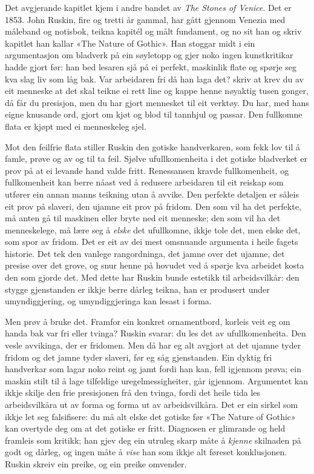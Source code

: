 Det avgjerande kapitlet kjem i andre bandet av \textit{The Stones of Venice}. Det er 1853. John Ruskin, fire og tretti år gammal, har gått gjennom Venezia med måleband og notisbok, teikna kapitél og målt fundament, og no sit han og skriv kapitlet han kallar «The Nature of Gothic». Han stoggar midt i ein argumentasjon om bladverk på ein søyletopp og gjer noko ingen kunstkritikar hadde gjort før: han bed lesaren sjå på ei perfekt, maskinlik flate og spørje seg kva slag liv som låg bak. Var arbeidaren fri då han laga det? \textcite{ruskin1853stones} skriv at krev du av eit menneske at det skal teikne ei rett line og kappe henne nøyaktig tusen gonger, då får du presisjon, men du har gjort mennesket til eit verktøy. Du har, med hans eigne knusande ord, gjort om kjøt og blod til tannhjul og passar. Den fullkomne flata er kjøpt med ei menneskeleg sjel.

Mot den feilfrie flata stiller Ruskin den gotiske handverkaren, som fekk lov til å famle, prøve og av og til ta feil. Sjølve ufullkomenheita i det gotiske bladverket er prov på at ei levande hand valde fritt. Renessansen kravde fullkomenheit, og fullkomenheit kan berre nåast ved å redusere arbeidaren til eit reiskap som utfører ein annan manns teikning utan å avvike. Den perfekte detaljen er såleis eit prov på slaveri, den ujamne eit prov på fridom. Den som vil ha det perfekte, må anten gå til maskinen eller bryte ned eit menneske; den som vil ha det menneskelege, må lære seg å \emph{elske} det ufullkomne, ikkje tole det, men elske det, som spor av fridom. Det er eit av dei mest omsnuande argumenta i heile fagets historie. Det tek den vanlege rangordninga, det jamne over det ujamne, det presise over det grove, og snur henne på hovudet ved å spørje kva arbeidet kosta den som gjorde det. Med dette har Ruskin bunde estetikk til arbeidsvilkår: den stygge gjenstanden er ikkje berre dårleg teikna, han er produsert under umyndiggjering, og umyndiggjeringa kan lesast i forma.

Men prøv å bruke det. Framfor ein konkret ornamentbord, korleis veit eg om handa bak var fri eller tvinga? Ruskin svarar: du les det av ufullkomenheita. Den vesle avvikinga, der er fridomen. Men då har eg alt avgjort at det ujamne tyder fridom og det jamne tyder slaveri, før eg såg gjenstanden. Ein dyktig fri handverkar som lagar noko reint og jamt fordi han kan, fell igjennom prøva; ein maskin stilt til å lage tilfeldige uregelmessigheiter, går igjennom. Argumentet kan ikkje skilje den frie presisjonen frå den tvinga, fordi det heile tida les arbeidsvilkåra ut av forma og forma ut av arbeidsvilkåra. Det er ein sirkel som ikkje let seg falsifisere: du må alt elske det gotiske før «The Nature of Gothic» kan overtyde deg om at det gotiske er fritt. Diagnosen er glimrande og held framleis som kritikk; han gjev deg ein utruleg skarp måte å \emph{kjenne} skilnaden på godt og dårleg, og ingen måte å \emph{vise} han som ikkje alt føreset konklusjonen. Ruskin skreiv ein preike, og ein preike omvender.

